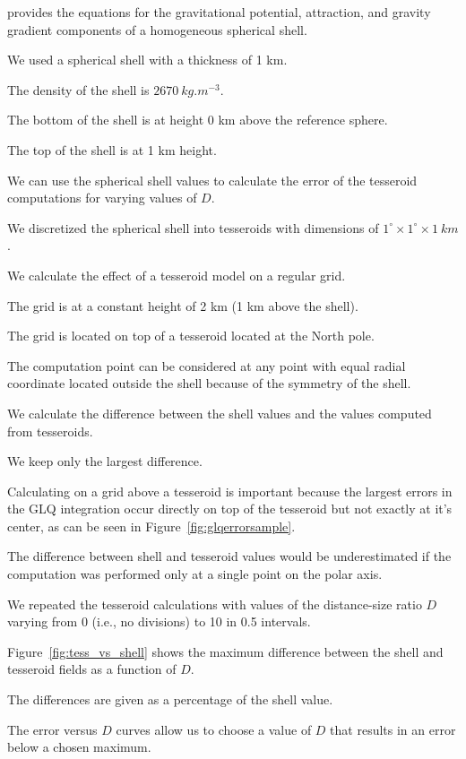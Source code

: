\documentclass[paper,twocolumn]{geophysics}
\begin{document}
\citep{Grombein2013} provides the equations for
the gravitational potential, attraction, and gravity gradient components
of a homogeneous spherical shell.

We used a spherical shell with a thickness of 1 km.

The density of the shell is $2670\ kg.m^{-3}$.

The bottom of the shell is at height 0 km above the reference sphere.

The top of the shell is at 1 km height.


We can use the spherical shell values to calculate the error of the tesseroid
computations for varying values of $D$.

We discretized the spherical shell into tesseroids
with dimensions of $1^\circ \times 1^\circ \times 1\ km$.

We calculate the effect of a tesseroid model on a regular grid.

The grid is at a constant height of 2 km (1 km above the shell).

The grid is located on top of a tesseroid located at the North pole.

The computation point can be considered at any point with equal radial
coordinate located outside the shell because of the symmetry of the shell.

We calculate the difference between the shell values and the values computed
from tesseroids.

We keep only the largest difference.

Calculating on a grid above a tesseroid is important because
the largest errors in the GLQ integration occur directly on top of the
tesseroid but not exactly at it's center, as can be seen in
Figure~\ref{fig:glqerrorsample}.

The difference between shell and tesseroid values would be underestimated
if the computation was performed only at a single point on the polar axis.

We repeated the tesseroid calculations with values of the distance-size ratio
$D$ varying from 0 (i.e., no divisions) to 10 in 0.5 intervals.



Figure~\ref{fig:tess_vs_shell} shows the maximum difference between the
shell and tesseroid fields as a function of $D$.

The differences are given as a percentage of the shell value.

The error versus $D$ curves allow us to choose a value of $D$ that
results in an error below a chosen maximum.
\end{document}
